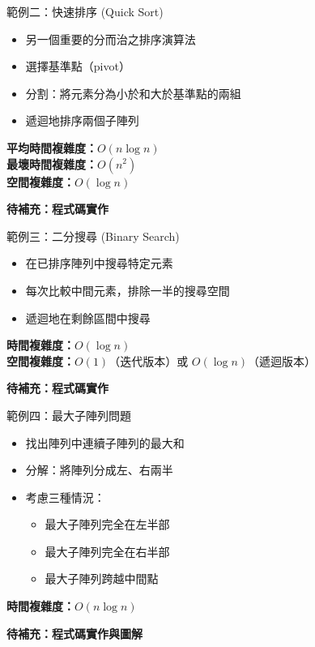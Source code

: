 \documentclass{beamer}
\begin{document}
\begin{frame}{範例二：快速排序 (Quick Sort)}
\begin{itemize}
    \item 另一個重要的分而治之排序演算法
    \item 選擇基準點（pivot）
    \item 分割：將元素分為小於和大於基準點的兩組
    \item 遞迴地排序兩個子陣列
\end{itemize}

\vspace{1em}
\textbf{平均時間複雜度：}$O(n \log n)$\\
\textbf{最壞時間複雜度：}$O(n^2)$\\
\textbf{空間複雜度：}$O(\log n)$

\vspace{1em}
\textbf{待補充：程式碼實作}
\end{frame}

\begin{frame}{範例三：二分搜尋 (Binary Search)}
\begin{itemize}
    \item 在已排序陣列中搜尋特定元素
    \item 每次比較中間元素，排除一半的搜尋空間
    \item 遞迴地在剩餘區間中搜尋
\end{itemize}

\vspace{1em}
\textbf{時間複雜度：}$O(\log n)$\\
\textbf{空間複雜度：}$O(1)$（迭代版本）或 $O(\log n)$（遞迴版本）

\vspace{1em}
\textbf{待補充：程式碼實作}
\end{frame}

\begin{frame}{範例四：最大子陣列問題}
\begin{itemize}
    \item 找出陣列中連續子陣列的最大和
    \item 分解：將陣列分成左、右兩半
    \item 考慮三種情況：
    \begin{itemize}
        \item 最大子陣列完全在左半部
        \item 最大子陣列完全在右半部
        \item 最大子陣列跨越中間點
    \end{itemize}
\end{itemize}

\vspace{1em}
\textbf{時間複雜度：}$O(n \log n)$

\vspace{1em}
\textbf{待補充：程式碼實作與圖解}
\end{frame}
\end{document}
